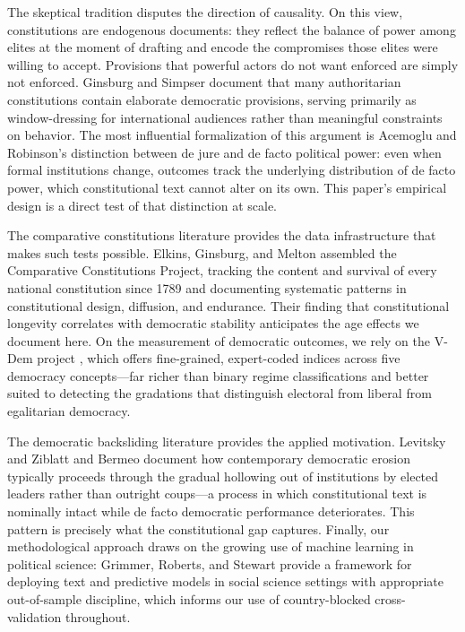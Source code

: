 \documentclass[9pt,twoside]{pnas-new}
\begin{document}
The skeptical tradition disputes the direction of causality. On this view, constitutions are endogenous documents: they reflect the balance of power among elites at the moment of drafting and encode the compromises those elites were willing to accept. Provisions that powerful actors do not want enforced are simply not enforced. Ginsburg and Simpser \cite{ginsburg_simpser_2014} document that many authoritarian constitutions contain elaborate democratic provisions, serving primarily as window-dressing for international audiences rather than meaningful constraints on behavior. The most influential formalization of this argument is Acemoglu and Robinson's \cite{acemoglu_robinson_2006} distinction between de jure and de facto political power: even when formal institutions change, outcomes track the underlying distribution of de facto power, which constitutional text cannot alter on its own. This paper's empirical design is a direct test of that distinction at scale.

The comparative constitutions literature provides the data infrastructure that makes such tests possible. Elkins, Ginsburg, and Melton \cite{elkins_ginsburg_melton_2009} assembled the Comparative Constitutions Project, tracking the content and survival of every national constitution since 1789 and documenting systematic patterns in constitutional design, diffusion, and endurance. Their finding that constitutional longevity correlates with democratic stability anticipates the age effects we document here. On the measurement of democratic outcomes, we rely on the V-Dem project \cite{coppedge_vdem_2024}, which offers fine-grained, expert-coded indices across five democracy concepts---far richer than binary regime classifications and better suited to detecting the gradations that distinguish electoral from liberal from egalitarian democracy.

The democratic backsliding literature provides the applied motivation. Levitsky and Ziblatt \cite{levitsky_ziblatt_2018} and Bermeo \cite{bermeo_2016} document how contemporary democratic erosion typically proceeds through the gradual hollowing out of institutions by elected leaders rather than outright coups---a process in which constitutional text is nominally intact while de facto democratic performance deteriorates. This pattern is precisely what the constitutional gap captures. Finally, our methodological approach draws on the growing use of machine learning in political science: Grimmer, Roberts, and Stewart \cite{grimmer_roberts_stewart_2022} provide a framework for deploying text and predictive models in social science settings with appropriate out-of-sample discipline, which informs our use of country-blocked cross-validation throughout.
\end{document}

